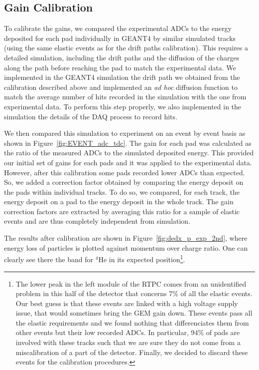 \documentclass[preprint,5p]{elsarticle}
\begin{document}
\subsection{Gain Calibration}

To calibrate the gains, we compared the experimental ADCs to the energy 
deposited for each pad individually in GEANT4 by similar simulated tracks 
(using the same elastic events as for the drift paths calibration). This 
requires a detailed simulation, including the drift paths and the diffusion of 
the charges along the path before reaching the pad to 
match the experimental data. We implemented in the GEANT4 simulation the
drift path we obtained from the calibration described above and implemented an {\it ad 
hoc} diffusion function to match the average number of hits recorded in the simulation with
the one from experimental data. To perform this step properly, we also implemented in
the simulation the details of the DAQ process to record hits. 

We then compared this simulation to experiment on an event by event basis as 
shown in Figure~\ref{fig:EVENT_adc_tdc}. The gain for each pad was calculated 
as the ratio of the measured ADCs to the simulated deposited energy. This 
provided our initial set of gains for each pads and it was applied to the 
experimental data. However, after this calibration some pads recorded lower ADCs 
than expected. So, we added a correction factor obtained by comparing  
the energy deposit on the pads within individual tracks. To do so, we compared, for 
each track, the energy deposit on a pad to the energy deposit in the whole track. 
The gain correction factors are extracted by averaging this ratio for a sample 
of elastic events and are thus completely independent from simulation. 

The results after calibration are shown in Figure~\ref{fig:dedx_p_exp_2nd}, where energy 
loss of particles is plotted against momentum over charge ratio. One can 
clearly see there the band for $^4$He in its expected position\footnote{The lower peak 
   in the left module of the RTPC comes from an unidentified problem in this half 
   of the detector that concerns 7\% of all the elastic events. 
   Our best guess is that these events are linked with a high voltage supply 
   issue, that would sometimes bring the GEM gain down. These events pass all 
   the elastic requirements and we found nothing that differenciates them 
   from other events but their low recorded ADCs. In particular, 94\% of pads
   are involved with these tracks such that we are sure they do not come from 
   a miscalibration of a part of the detector. Finally, we decided to discard
   these events for the calibration procedures.}.
\end{document}

